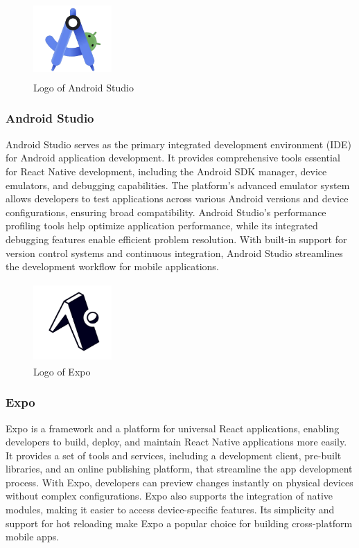         \begin{figure}[htbp]
            \centerline{\includegraphics[width=3cm, height=3cm]{Images/logo/android.png}}
            \caption{Logo of Android Studio}
            \label{fig}
        \end{figure}
        \subsubsection{Android Studio}
            Android Studio serves as the primary integrated development environment (IDE) for Android application development. It provides comprehensive tools essential for React Native development, including the Android SDK manager, device emulators, and debugging capabilities. The platform's advanced emulator system allows developers to test applications across various Android versions and device configurations, ensuring broad compatibility. Android Studio's performance profiling tools help optimize application performance, while its integrated debugging features enable efficient problem resolution. With built-in support for version control systems and continuous integration, Android Studio streamlines the development workflow for mobile applications.

        \begin{figure}[htbp]
            \centerline{\includegraphics[width=3cm, height=3cm]{Images/logo/expo.png}}
            \caption{Logo of Expo}
            \label{fig}
        \end{figure}
        \subsubsection{Expo}
            Expo is a framework and a platform for universal React applications, enabling developers to build, deploy, and maintain React Native applications more easily. It provides a set of tools and services, including a development client, pre-built libraries, and an online publishing platform, that streamline the app development process. With Expo, developers can preview changes instantly on physical devices without complex configurations. Expo also supports the integration of native modules, making it easier to access device-specific features. Its simplicity and support for hot reloading make Expo a popular choice for building cross-platform mobile apps.

